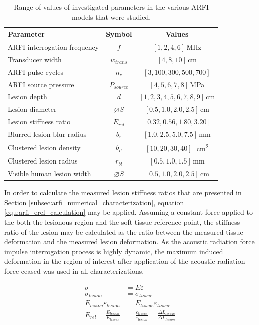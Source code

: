 			\begin{table}[!htb]
				\centering
				\caption[ARFI model investigated parameters]{Range of values of investigated parameters in the various ARFI models that were studied.}
				\label{tab:arfi-parametervalues}
				\begin{tabular}{lcc}
					\toprule
					Parameter & Symbol & Values \\
					\midrule
					ARFI interrogation frequency & $f$ & $[1, 2, 4, 6]$\,\si{\MHz} \\
					Transducer width & $w_{trans}$ & $[4, 8, 10]$\,\si{\cm} \\
					ARFI pulse cycles & $n_c$ & $[3, 100, 300, 500, 700]$ \\
					ARFI source pressure & $P_{source}$ & $[4, 5, 6, 7, 8]$\,\si{\MPa} \\
					Lesion depth & $d$ & $[1, 2, 3, 4, 5, 6, 7, 8, 9]$\,\si{\cm} \\
					Lesion diameter & $\diameter S$ & $[0.5, 1.0, 2.0, 2.5]$\,\si{\cm} \\
					Lesion stiffness ratio & $E_{rel}$ & $[0.32, 0.56, 1.80, 3.20]$ \\
					Blurred lesion blur radius & $b_r$ & $[1.0, 2.5, 5.0, 7.5]$\,\si{\mm} \\
					Clustered lesion density & $b_\rho$ & $[10, 20, 30, 40]$\,\si{\per\cm\squared} \\
					Clustered lesion radius & $r_{bl}$ & $[0.5, 1.0, 1.5]$\,\si{\mm} \\
					Visible human lesion width & $\diameter S$ & $[0.5, 1.0, 2.0, 2.5]$\,\si{\cm} \\
					\bottomrule
				\end{tabular}
			\end{table}

			In order to calculate the measured lesion stiffness ratios that are presented in Section \ref{subsec:arfi_numerical_characterization}, equation \ref{equ:arfi_erel_calculation} may be applied. Assuming a constant force applied to the both the lesionous region and the soft tissue reference point, the stiffness ratio of the lesion may be calculated as the ratio between the measured tissue deformation and the measured lesion deformation. As the acoustic radiation force impulse interrogation process is highly dynamic, the maximum induced deformation in the region of interest after application of the acoustic radiation force ceased was used in all characterizations.

			\begin{subequations}
				\label{equ:arfi_erel_calculation}
				\begin{align}
					\sigma &= E \varepsilon \\
					\sigma_{lesion} &= \sigma_{tissue} \\
					E_{lesion} \varepsilon_{lesion} &= E_{tissue} \varepsilon_{tissue} \\
					E_{rel} = \frac{E_{lesion}}{E_{tissue}} &= \frac{\varepsilon_{tissue}}{\varepsilon_{lesion}} = \frac{\Delta L_{tissue}}{\Delta L_{lesion}}
				\end{align}
			\end{subequations}

